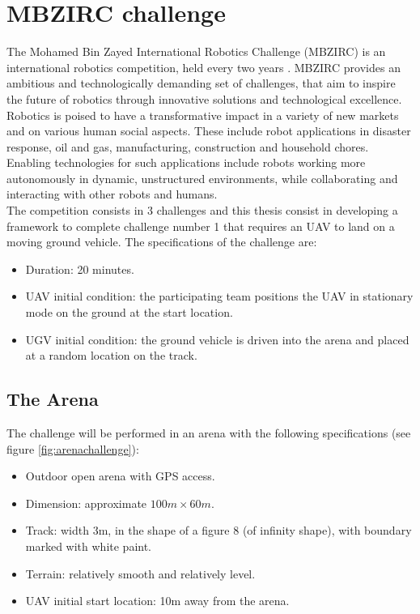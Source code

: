 \section{MBZIRC challenge}\label{chap:thechallenge}
The Mohamed Bin Zayed International Robotics Challenge (MBZIRC) is an international robotics competition, held every two years \cite{challenge_description}. MBZIRC provides an ambitious and technologically demanding set of challenges, that aim to inspire the future of robotics through innovative solutions and technological excellence.\\
Robotics is poised to have a transformative impact in a variety of new markets and on various human social aspects. These include robot applications in disaster response, oil and gas, manufacturing, construction and household chores. Enabling technologies for such applications include robots working more autonomously in dynamic, unstructured environments, while collaborating and interacting with other robots and humans. \\
The competition consists in 3 challenges and this thesis consist in developing a framework to complete challenge number 1 that requires an UAV to land on a moving ground vehicle. 
The specifications of the challenge are:
\begin{itemize}
\item Duration: 20 minutes.
\item UAV initial condition: the participating team positions the UAV in stationary mode on the ground at the start location.
\item UGV initial condition: the ground vehicle is driven into the arena and placed at a random location on the track.
\end{itemize}

 

\subsection{The Arena}
The challenge will be performed in an arena with the following specifications (see figure \ref{fig:arenachallenge}):
\begin{itemize}
\item Outdoor open arena with GPS access.
\item Dimension: approximate  $100m \times 60m$.
\item Track: width 3m, in the shape of a figure 8 (of infinity shape), with boundary marked with white paint.
\item Terrain: relatively smooth and relatively level. 
\item UAV initial start location: 10m away from the arena.
\end{itemize}

